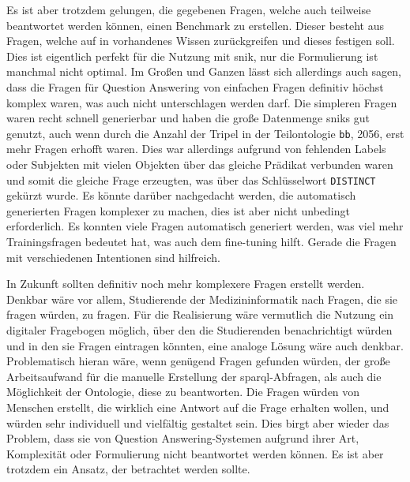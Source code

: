 Es ist aber trotzdem gelungen, die gegebenen Fragen, welche auch teilweise beantwortet werden können, einen Benchmark zu erstellen.
Dieser besteht aus Fragen, welche auf in \citet{bb} vorhandenes Wissen zurückgreifen und dieses festigen soll.
Dies ist eigentlich perfekt für die Nutzung mit \ac{snik}, nur die Formulierung ist manchmal nicht optimal.
Im Großen und Ganzen lässt sich allerdings auch sagen, dass die Fragen für Question Answering von einfachen Fragen definitiv höchst komplex waren, was auch nicht unterschlagen werden darf.
Die simpleren Fragen waren recht schnell generierbar und haben die große Datenmenge \ac{snik}s gut genutzt,
auch wenn durch die Anzahl der Tripel in der Teilontologie \texttt{bb}, 2056, erst mehr Fragen erhofft waren.
Dies war allerdings aufgrund von fehlenden Labels oder Subjekten mit vielen Objekten über das gleiche Prädikat verbunden waren und somit die gleiche Frage erzeugten,
was über das Schlüsselwort \texttt{DISTINCT} gekürzt wurde.
Es könnte darüber nachgedacht werden, die automatisch generierten Fragen komplexer zu machen, dies ist aber nicht unbedingt erforderlich.
Es konnten viele Fragen automatisch generiert werden, was viel mehr Trainingsfragen bedeutet hat, was auch dem fine-tuning hilft.
Gerade die Fragen mit verschiedenen Intentionen sind hilfreich.

In Zukunft sollten definitiv noch mehr komplexere Fragen erstellt werden.
Denkbar wäre vor allem, Studierende der Medizininformatik nach Fragen, die sie fragen würden, zu fragen.
Für die Realisierung wäre vermutlich die Nutzung ein digitaler Fragebogen möglich, über den die Studierenden benachrichtigt würden und in den sie Fragen eintragen könnten,
eine analoge Lösung wäre auch denkbar.
Problematisch hieran wäre, wenn genügend Fragen gefunden würden, der große Arbeitsaufwand für die manuelle Erstellung der \ac{sparql}-Abfragen, als auch die Möglichkeit der Ontologie, diese zu beantworten.
Die Fragen würden von Menschen erstellt, die wirklich eine Antwort auf die Frage erhalten wollen, und würden sehr individuell und vielfältig gestaltet sein.
Dies birgt aber wieder das Problem, dass sie von Question Answering-Systemen aufgrund ihrer Art, Komplexität oder Formulierung nicht beantwortet werden können.
Es ist aber trotzdem ein Ansatz, der betrachtet werden sollte.

